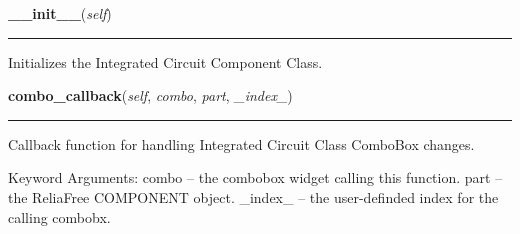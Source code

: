     \label{reliafree:integrated_circuits:ic:IntegratedCircuit:__init__}

    \vspace{0.5ex}

\hspace{.8\funcindent}\begin{boxedminipage}{\funcwidth}

    \raggedright \textbf{\_\_init\_\_}(\textit{self})

    \vspace{-1.5ex}

    \rule{\textwidth}{0.5\fboxrule}
\setlength{\parskip}{2ex}
    Initializes the Integrated Circuit Component Class.

\setlength{\parskip}{1ex}
    \end{boxedminipage}

    \label{reliafree:integrated_circuits:ic:IntegratedCircuit:combo_callback}

    \vspace{0.5ex}

\hspace{.8\funcindent}\begin{boxedminipage}{\funcwidth}

    \raggedright \textbf{combo\_callback}(\textit{self}, \textit{combo}, \textit{part}, \textit{\_index\_})

    \vspace{-1.5ex}

    \rule{\textwidth}{0.5\fboxrule}
\setlength{\parskip}{2ex}
    Callback function for handling Integrated Circuit Class ComboBox 
    changes.

    Keyword Arguments: combo   -- the combobox widget calling this 
    function. part    -- the ReliaFree COMPONENT object. \_index\_ -- the 
    user-definded index for the calling combobx.

\setlength{\parskip}{1ex}
    \end{boxedminipage}

